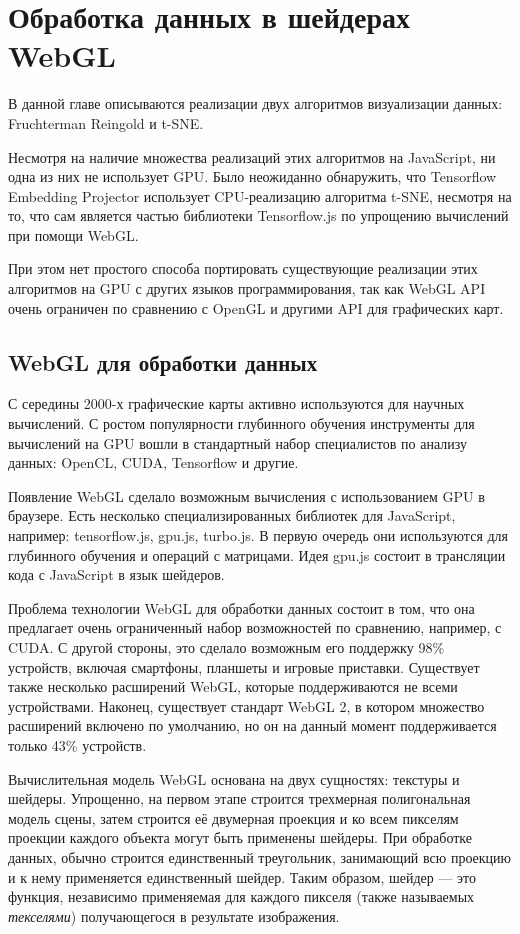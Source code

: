\chapter{Обработка данных в шейдерах WebGL}

В данной главе описываются реализации двух алгоритмов визуализации данных: Fruchterman Reingold и t-SNE.

Несмотря на наличие множества реализаций этих алгоритмов на JavaScript, ни одна из них не использует GPU. Было неожиданно обнаружить, что Tensorflow Embedding Projector использует CPU-реализацию алгоритма t-SNE, несмотря на то, что сам является частью библиотеки Tensorflow.js по упрощению вычислений при помощи WebGL.

При этом нет простого способа портировать существующие реализации этих алгоритмов на GPU с других языков программирования, так как WebGL API очень ограничен по сравнению с OpenGL и другими API для графических карт.



\section{WebGL для обработки данных}
\label{sec:webgl_data_analysis}

С середины 2000-х графические карты активно используются для научных вычислений. С ростом популярности глубинного обучения инструменты для вычислений на GPU вошли в стандартный набор специалистов по анализу данных: OpenCL, CUDA, Tensorflow и другие.

Появление WebGL сделало возможным вычисления с использованием GPU в браузере. Есть несколько специализированных библиотек для JavaScript, например: tensorflow.js, gpu.js, turbo.js. В первую очередь они используются для глубинного обучения и операций с матрицами. Идея gpu.js состоит в трансляции кода с JavaScript в язык шейдеров.

Проблема технологии WebGL для обработки данных состоит в том, что она предлагает очень ограниченный набор возможностей по сравнению, например, с CUDA. С другой стороны, это сделало возможным его поддержку 98\% устройств, включая смартфоны, планшеты и игровые приставки. Существует также несколько расширений WebGL, которые поддерживаются не всеми устройствами. Наконец, существует стандарт WebGL 2, в котором множество расширений включено по умолчанию, но он на данный момент поддерживается только 43\% устройств.

Вычислительная модель WebGL основана на двух сущностях: текстуры и шейдеры. Упрощенно, на первом этапе строится трехмерная полигональная модель сцены, затем строится её двумерная проекция и ко всем пикселям проекции каждого объекта могут быть применены шейдеры. При обработке данных, обычно строится единственный треугольник, занимающий всю проекцию и к нему применяется единственный шейдер. Таким образом, шейдер --- это функция, независимо применяемая для каждого пикселя (также называемых {\itshape текселями}) получающегося в результате изображения.

